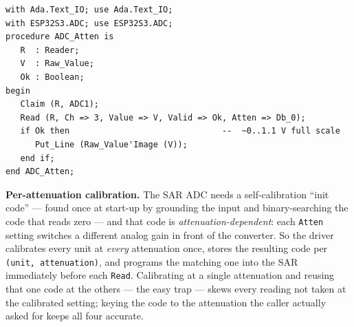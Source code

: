 \begin{lstlisting}
with Ada.Text_IO; use Ada.Text_IO;
with ESP32S3.ADC; use ESP32S3.ADC;
procedure ADC_Atten is
   R  : Reader;
   V  : Raw_Value;
   Ok : Boolean;
begin
   Claim (R, ADC1);
   Read (R, Ch => 3, Value => V, Valid => Ok, Atten => Db_0);
   if Ok then                               --  ~0..1.1 V full scale
      Put_Line (Raw_Value'Image (V));
   end if;
end ADC_Atten;
\end{lstlisting}

\textbf{Per-attenuation calibration.} The SAR ADC needs a self-calibration
``init code'' --- found once at start-up by grounding the input and binary-searching
the code that reads zero --- and that code is \emph{attenuation-dependent}: each
\texttt{Atten} setting switches a different analog gain in front of the converter.
So the driver calibrates every unit at \emph{every} attenuation once, stores the
resulting code per \texttt{(unit, attenuation)}, and programs the matching one into
the SAR immediately before each \texttt{Read}. Calibrating at a single attenuation
and reusing that one code at the others --- the easy trap --- skews every reading
not taken at the calibrated setting; keying the code to the attenuation the caller
actually asked for keeps all four accurate.
